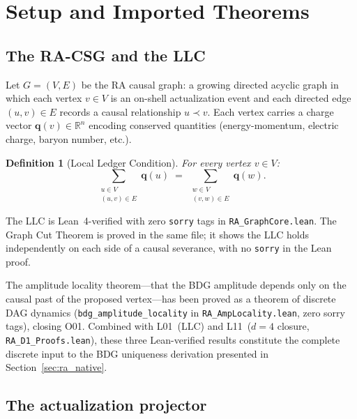 \documentclass[11pt,a4paper]{article}
\newtheorem{definition}[theorem]{Definition}
\begin{document}
\section{Setup and Imported Theorems}
\label{sec:setup}

\subsection{The RA-CSG and the LLC}

Let $G = (V, E)$ be the RA causal graph: a growing directed acyclic
graph in which each vertex $v \in V$ is an on-shell actualization
event and each directed edge $(u,v) \in E$ records a causal
relationship $u \prec v$. Each vertex carries a charge vector
$\mathbf{q}(v) \in \mathbb{R}^n$ encoding conserved quantities
(energy-momentum, electric charge, baryon number, etc.).

\begin{definition}[Local Ledger Condition]
\label{def:LLC}
For every vertex $v \in V$:
\begin{equation}
  \sum_{\substack{u \in V \\ (u,v)\in E}} \mathbf{q}(u)
  \;=\;
  \sum_{\substack{w \in V \\ (v,w)\in E}} \mathbf{q}(w).
\end{equation}
\end{definition}

\noindent
The LLC is Lean~4-verified with zero \texttt{sorry} tags in
\texttt{RA\_GraphCore.lean}. The Graph Cut
Theorem is proved in the same file; it shows the LLC holds independently on
each side of a causal severance, with no \texttt{sorry} in the Lean
proof.

The amplitude locality theorem---that the BDG amplitude depends only on the
causal past of the proposed vertex---has been proved as a theorem of
discrete DAG dynamics (\texttt{bdg\_amplitude\_locality} in
\texttt{RA\_AmpLocality.lean}, zero sorry tags), closing O01. Combined with
L01~(LLC) and L11~($d=4$ closure, \texttt{RA\_D1\_Proofs.lean}), these
three Lean-verified results constitute the complete discrete input to the
BDG uniqueness derivation presented in Section~\ref{sec:ra_native}.

\subsection{The actualization projector}
\end{document}
